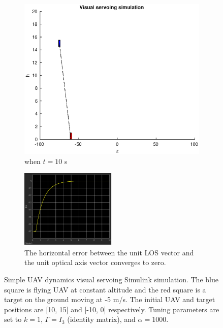 \begin{figure}[htbp]
\begin{subfigure}[t]{0.45\linewidth}
		\includegraphics[width=\textwidth]{images/chapter4/another_simple_ten}
		\caption{when $t=10$ s}
	\end{subfigure}
	\begin{subfigure}[t]{0.8\linewidth}
		\centering
		\includegraphics[width=0.5\textwidth]{images/chapter4/another_simple_ex}
		\caption{The horizontal error between the unit LOS vector and the unit optical axis vector converges to zero.}
	\end{subfigure}	
	\caption[Simple UAV dynamics visual servoing Simulink simulation.]{Simple UAV dynamics visual servoing Simulink simulation. The blue square is flying UAV at constant altitude and the red square is a target on the ground moving at -5 m/s. The initial UAV and target positions are [10, 15] and [-10, 0] respectively. Tuning parameters are set to $k=1$, $\Gamma=I_3$ (identity matrix), and $\alpha=1000$.}
	\label{another_simple_simulation}
\end{figure}


